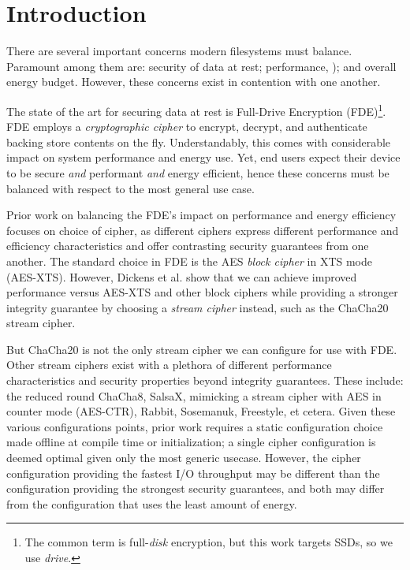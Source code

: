 \section{Introduction}\label{sec:introduction}

There are several important concerns modern filesystems must balance.
Paramount among them are: security of data at rest; performance, ); and overall energy budget. However, these concerns exist in
contention with one another. 

The state of the art for securing data at rest is Full-Drive Encryption
(FDE)\footnote{The common term is full-\emph{disk} encryption, but this work
targets SSDs, so we use \emph{drive}.}. FDE employs a \emph{cryptographic
cipher} to encrypt, decrypt, and authenticate backing store contents on the fly.
Understandably, this comes with considerable impact on system performance and
energy use.  Yet, end users expect their device to be secure
\emph{and} performant \emph{and} energy efficient, hence these concerns must be
balanced with respect to the most general use case.

Prior work on balancing the FDE's impact on performance and energy efficiency
focuses on choice of cipher, as different ciphers express different performance
and efficiency characteristics and offer contrasting security guarantees from
one another. The standard choice in FDE is the AES \emph{block cipher} in XTS
mode (AES-XTS). However, Dickens et al.\cite{StrongBox} show that we can achieve
improved performance versus AES-XTS and other block ciphers while providing a
stronger integrity guarantee by choosing a \emph{stream cipher} instead, such as
the ChaCha20\cite{ChaCha20} stream cipher.

But ChaCha20 is not the only stream cipher we can configure for use with FDE.
Other stream ciphers exist with a plethora of different performance
characteristics and security properties beyond integrity guarantees. These
include: the reduced round ChaCha8\cite{ChaCha8}, SalsaX\cite{SalsaX}, mimicking
a stream cipher with AES in counter mode (AES-CTR)\cite{AES-CTR},
Rabbit\cite{Rabbit}, Sosemanuk\cite{Sosemanuk}, Freestyle\cite{Freestyle}, et
cetera. Given these various configurations points, prior work requires a static
configuration choice made offline at compile time or initialization; a single
cipher configuration is deemed optimal given only the most generic usecase.
However, the cipher configuration providing the fastest I/O throughput may be
different than the configuration providing the strongest security guarantees,
and both may differ from the configuration that uses the least amount of energy.

